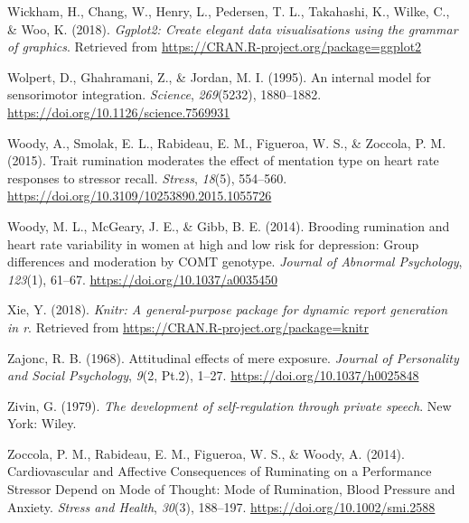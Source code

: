 \documentclass[a4paper,12pt,twoside,openright,oldfontcommands]{memoir}
\begin{document}
\leavevmode\hypertarget{ref-R-ggplot2}{}%
Wickham, H., Chang, W., Henry, L., Pedersen, T. L., Takahashi, K., Wilke, C., \& Woo, K. (2018). \emph{Ggplot2: Create elegant data visualisations using the grammar of graphics}. Retrieved from \url{https://CRAN.R-project.org/package=ggplot2}

\leavevmode\hypertarget{ref-wolpert_internal_1995}{}%
Wolpert, D., Ghahramani, Z., \& Jordan, M. I. (1995). An internal model for sensorimotor integration. \emph{Science}, \emph{269}(5232), 1880--1882. \url{https://doi.org/10.1126/science.7569931}

\leavevmode\hypertarget{ref-woody_trait_2015}{}%
Woody, A., Smolak, E. L., Rabideau, E. M., Figueroa, W. S., \& Zoccola, P. M. (2015). Trait rumination moderates the effect of mentation type on heart rate responses to stressor recall. \emph{Stress}, \emph{18}(5), 554--560. \url{https://doi.org/10.3109/10253890.2015.1055726}

\leavevmode\hypertarget{ref-woody_brooding_2014}{}%
Woody, M. L., McGeary, J. E., \& Gibb, B. E. (2014). Brooding rumination and heart rate variability in women at high and low risk for depression: Group differences and moderation by COMT genotype. \emph{Journal of Abnormal Psychology}, \emph{123}(1), 61--67. \url{https://doi.org/10.1037/a0035450}

\leavevmode\hypertarget{ref-R-knitr}{}%
Xie, Y. (2018). \emph{Knitr: A general-purpose package for dynamic report generation in r}. Retrieved from \url{https://CRAN.R-project.org/package=knitr}

\leavevmode\hypertarget{ref-zajonc_attitudinal_1968}{}%
Zajonc, R. B. (1968). Attitudinal effects of mere exposure. \emph{Journal of Personality and Social Psychology}, \emph{9}(2, Pt.2), 1--27. \url{https://doi.org/10.1037/h0025848}

\leavevmode\hypertarget{ref-zivin_development_1979}{}%
Zivin, G. (1979). \emph{The development of self-regulation through private speech}. New York: Wiley.

\leavevmode\hypertarget{ref-zoccola_cardiovascular_2014}{}%
Zoccola, P. M., Rabideau, E. M., Figueroa, W. S., \& Woody, A. (2014). Cardiovascular and Affective Consequences of Ruminating on a Performance Stressor Depend on Mode of Thought: Mode of Rumination, Blood Pressure and Anxiety. \emph{Stress and Health}, \emph{30}(3), 188--197. \url{https://doi.org/10.1002/smi.2588}
\end{document}
